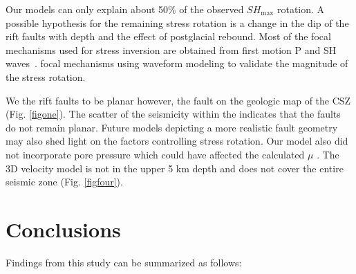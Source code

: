 \documentclass[draft]{agujournal2018}
\begin{document}
Our models can only explain about 50\% of the observed $SH_{\max}$ rotation. A possible hypothesis for the remaining stress rotation is a change in the dip of the rift faults with depth and the effect of postglacial rebound.  Most of the focal mechanisms used for stress inversion  are obtained from first motion P and SH waves~\citep{Mazzotti_2010,lamontagne1998}.  focal mechanisms  using waveform modeling  to validate the magnitude of the stress rotation.

We  the rift faults to be planar however, the fault  on the geologic map of the CSZ  (Fig. \ref{figone}). The scatter of the seismicity within the  indicates that the faults do not remain planar. Future models depicting a more realistic fault geometry may also shed light on the factors controlling stress rotation. Our model also did not incorporate pore pressure which could have affected the calculated $\mu$ .
The 3D velocity model is not  in the upper 5 km depth and does not cover the entire seismic zone (Fig. \ref{figfour}).


\section{Conclusions}
Findings from this study can be summarized as follows:
\end{document}
